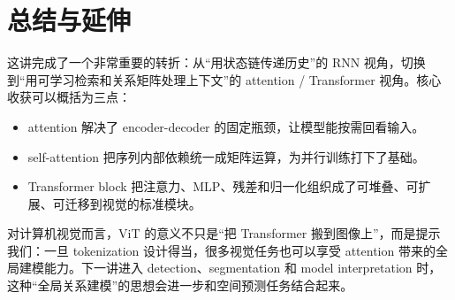 \documentclass[a4paper]{article}
\begin{document}
\section{总结与延伸}
这讲完成了一个非常重要的转折：从“用状态链传递历史”的 RNN 视角，切换到“用可学习检索和关系矩阵处理上下文”的 attention / Transformer 视角。核心收获可以概括为三点：

\begin{itemize}
\item attention 解决了 encoder-decoder 的固定瓶颈，让模型能按需回看输入。
\item self-attention 把序列内部依赖统一成矩阵运算，为并行训练打下了基础。
\item Transformer block 把注意力、MLP、残差和归一化组织成了可堆叠、可扩展、可迁移到视觉的标准模块。
\end{itemize}

对计算机视觉而言，ViT 的意义不只是“把 Transformer 搬到图像上”，而是提示我们：一旦 tokenization 设计得当，很多视觉任务也可以享受 attention 带来的全局建模能力。下一讲进入 detection、segmentation 和 model interpretation 时，这种“全局关系建模”的思想会进一步和空间预测任务结合起来。
\end{document}
